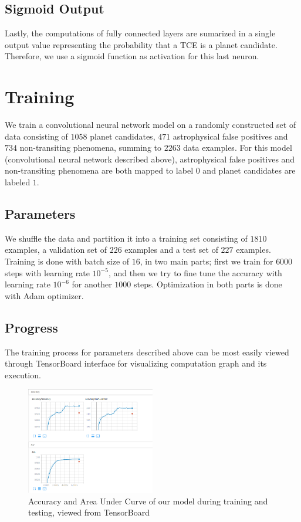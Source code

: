 \documentclass[twoside]{article}
\begin{document}
\begin{multicols}{2}
\subsection{Sigmoid Output}
Lastly, the computations of fully connected layers are sumarized in a single output value representing the probability that a TCE is a planet candidate. Therefore, we use a sigmoid function as activation for this last neuron.


\section{Training}
We train a convolutional neural network model on a randomly constructed set of data consisting of $1058$ planet candidates, $471$ astrophysical false positives and $734$ non-transiting phenomena, summing to $2263$ data examples. For this model (convolutional neural network described above), astrophysical false positives and non-transiting phenomena are both mapped to label $0$ and planet candidates are labeled $1$. 

\subsection{Parameters}
We shuffle the data and partition it into a training set consisting of $1810$ examples, a validation set of $226$ examples and a test set of $227$ examples. Training is done with batch size of $16$, in two main parts; first we train for $6000$ steps with learning rate $10^{-5}$, and then we try to fine tune the accuracy with learning rate $10^{-6}$ for another $1000$ steps. Optimization in both parts is done with Adam optimizer.

\subsection{Progress}
The training process for parameters described above can be most easily viewed through TensorBoard interface for visualizing computation graph and its execution. 
\begin{figure}[H]
\includegraphics[width=0.5\textwidth]{train-test_acc}
\caption{Accuracy and Area Under Curve of our model during training and testing, viewed from TensorBoard}
\label{fig:accuracy}
\end{figure}


\end{multicols}
\end{document}

